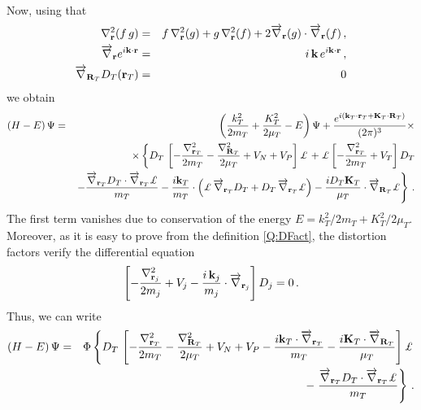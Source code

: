 \noindent Now, using that
\begin{eqnarray*}
\nabla^{2}_{\mathbf{r}}(f \, g) &=& f \, \nabla^{2}_{\mathbf{r}}(g) + g \,
\nabla^{2}_{\mathbf{r}}(f) + 2 \overrightarrow{\nabla}_{\mathbf{r}}(g) \cdot
\overrightarrow{\nabla}_{\mathbf{r}}(f) \, , \\
\overrightarrow{\nabla}_{\mathbf{r}} e^{i \mathbf{k}\cdot \mathbf{r}} &=&
i \,
\mathbf{k} \, e^{i \mathbf{k}\cdot \mathbf{r}} \, , \\
\overrightarrow{\nabla}_{\mathbf{R}_{T}} D_{T}(\mathbf{r}_{T}) &=& 0
\end{eqnarray*}
 we obtain
%
\begin{eqnarray*}
\left( H - E \right) \Psi &=& \left( \frac{k_{T}^{2}}{2m_{T}} +
\frac{K_{T}^{2}}{2 \mu_{T}} - E \right) \Psi + \frac{e^{ i
(\vect{k}_{T}\cdot \vect{r}_{T} + \vect{K}_{T} \cdot \vect{R}_{T})}}{(2 \pi)^3}
{\times}
\\
&&{\times} \left\{ D_{T} \, \left[ -\frac{\nabla^{2}_{\vect{r}_{T}}}{2 m_{T}}
-\frac{\nabla^{2}_{\vect{R}_{T}}}{2 \mu_{T}}  + V_{N} + V_{P} \right]
\pounds \right. + \pounds \left[-\frac{\nabla^{2}_{\vect{r}_{T}}}{2m_{T}}
+ V_{T} \right] D_{T}
\\
&&\left.-  \frac{ \overrightarrow{\nabla}_{\vect{r}_{T}}D_{T} \cdot
\overrightarrow{\nabla}_{\vect{r}_{T}} \pounds }{m_{T}} - \frac{i
\vect{k}_{T}}{m_{T}} \cdot \left( \pounds \,
\overrightarrow{\nabla}_{\vect{r}_{T}} D_{T} +  D_{T} \,
\overrightarrow{\nabla}_{\vect{r}_{T}}\pounds \right) - \frac{i D_{T}
\vect{K}_{T}}{\mu_{T}} \cdot \overrightarrow{\nabla}_{\vect{R}_{T}} \pounds
  \right\} \, .
\end{eqnarray*}
%
The first term vanishes due to conservation of the energy
$E=k_{T}^{2}/2m_{T} + K_{T}^{2}/2\mu_{T}$. Moreover, as it is easy to
prove from the definition \ref{Q:DFact}, the distortion factors verify
the differential equation
%
\begin{equation}\label{Q:DEDFact}
\left[-\frac{\nabla^{2}_{\mathbf{r}_{j}}}{2m_{j}} + V_{j} - \frac{ i \,
\mathbf{k}_{j}}{m_{j}} \cdot
\overrightarrow{\nabla}_{\mathbf{r}_{j}}\right]D_{j} = 0 \, .
\end{equation}
%
Thus, we can write
\begin{eqnarray}\label{Q:D-pot1}
\left( H - E \right) \Psi &=& \Phi \left\{ D_{T} \, \left[ -
\frac{\nabla^{2}_{\vect{r}_{T}}}{2 m_{T}}
-\frac{\nabla^{2}_{\vect{R}_{T}}}{2 \mu_{T}}  + V_{N} + V_{P} -
\frac{i \vect{k}_{T} \cdot \overrightarrow{\nabla}_{\vect{r}_{T}}
}{m_{T}} - \frac{i \vect{K}_{T} \cdot
\overrightarrow{\nabla}_{\vect{R}_{T}}}{\mu_{T}} \right] \pounds
 \right. \nonumber
\\
&&- \left. \frac{ \overrightarrow{\nabla}_{\vect{r}_{T}}D_{T} \cdot
\overrightarrow{\nabla}_{\vect{r}_{T}} \pounds }{m_{T}}
  \right\} \, .
\end{eqnarray}
